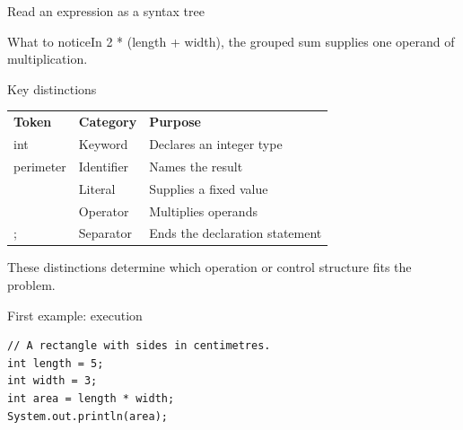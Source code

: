 \documentclass[10pt,aspectratio=169]{beamer}
\begin{document}
\begin{frame}[fragile,t]{Read an expression as a syntax tree}
\begin{center}\end{center}
\begin{block}{What to notice}In 2 * (length + width), the grouped sum supplies one operand of multiplication.\end{block}
\end{frame}
\begin{frame}[fragile,t]{Key distinctions}
\small\renewcommand{\arraystretch}{1.5}
\begin{tabularx}{\textwidth}{>{\raggedright\arraybackslash}X>{\raggedright\arraybackslash}X>{\raggedright\arraybackslash}X}
\rowcolor{navy}
\color{white}\bfseries Token & \color{white}\bfseries Category & \color{white}\bfseries Purpose\\
int & Keyword & Declares an integer type\\
perimeter & Identifier & Names the result\\
2 & Literal & Supplies a fixed value\\
* & Operator & Multiplies operands\\
; & Separator & Ends the declaration statement\\
\end{tabularx}
\vspace{3mm}\footnotesize These distinctions determine which operation or control structure fits the problem.
\end{frame}

\begin{frame}[fragile,t]{First example: execution}
\begin{lstlisting}
// A rectangle with sides in centimetres.
int length = 5;
int width = 3;
int area = length * width;
System.out.println(area);
\end{lstlisting}
\end{frame}
\end{document}
